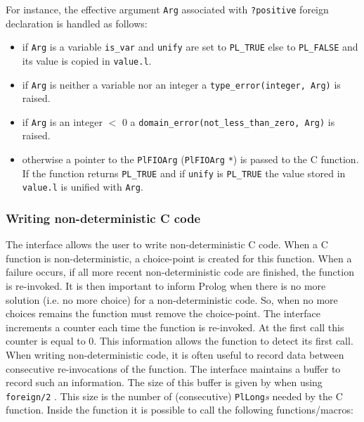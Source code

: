 For instance, the effective argument \texttt{Arg} associated with
\texttt{?positive} foreign declaration is handled as follows:

\begin{itemize}

\item if \texttt{Arg} is a variable \texttt{is\_var} and \texttt{unify} are
set to \texttt{PL\_TRUE} else to \texttt{PL\_FALSE} and its value is copied in
\texttt{value.l}.

\item if \texttt{Arg} is neither a variable nor an integer a
\texttt{type\_error(integer, Arg)} is raised.

\item if \texttt{Arg} is an integer $<$ 0 a
\texttt{domain\_error(not\_less\_than\_zero, Arg)} is raised.

\item otherwise a pointer to the \texttt{PlFIOArg} (\texttt{PlFIOArg}
\texttt{*}) is passed to the C function. If the function returns
\texttt{PL\_TRUE} and if \texttt{unify} is \texttt{PL\_TRUE} the value stored in
\texttt{value.l} is unified with \texttt{Arg}.

\end{itemize}

\subsubsection{Writing non-deterministic C code}
\label{Writing-non-deterministic-C-code}
The interface allows the user to write non-deterministic C code. When a C
function is non-deterministic, a choice-point is created for this function.
When a failure occurs, if all more recent non-deterministic code are
finished, the function is re-invoked. It is then important to inform Prolog
when there is no more solution (i.e. no more choice) for a non-deterministic
code. So, when no more choices remains the function must remove the
choice-point. The interface increments a counter each time the function is
re-invoked. At the first call this counter is equal to 0. This information
allows the function to detect its first call. When writing non-deterministic
code, it is often useful to record data between consecutive re-invocations of
the function. The interface maintains a buffer to record such an
information. The size of this buffer is given by
 when using \texttt{foreign/2}
. This size is the number of (consecutive)
\texttt{PlLong}\emph{s} needed by the C function. Inside the function it is
possible to call the following functions/macros:

